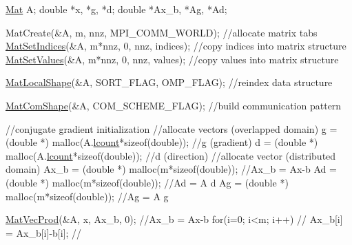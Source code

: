 \begin{DoxyCode}
    \hyperlink{structMat}{Mat} A;
    \textcolor{keywordtype}{double} *x, *g, *d;
    \textcolor{keywordtype}{double} *Ax\_b, *Ag, *Ad; 
   
    MatCreate(&A, m, nnz, MPI\_COMM\_WORLD);      \textcolor{comment}{//allocate matrix tabs}
    \hyperlink{group__matmap__group11_gaaf26c7678367e6757392c03abd22a105}{MatSetIndices}(&A, m*nnz, 0, nnz, indices);  \textcolor{comment}{//copy indices
       into matrix structure}
    \hyperlink{group__matmap__group11_gad3d5adb742e7a82454fcd6eede21da91}{MatSetValues}(&A, m*nnz, 0, nnz, values);    \textcolor{comment}{//copy values into
       matrix structure}
   
    \hyperlink{group__matmap__group11_gae31f7ccb10cda5c97e49f640feed1ad4}{MatLocalShape}(&A, SORT\_FLAG, OMP\_FLAG);     \textcolor{comment}{//reindex data
       structure}
   
    \hyperlink{group__matmap__group11_ga61b3b348d7c039aadfc3196e6b83535a}{MatComShape}(&A, COM\_SCHEME\_FLAG);           \textcolor{comment}{//build
       communication pattern }
   
    \textcolor{comment}{//conjugate gradient initialization}
    \textcolor{comment}{//allocate vectors (overlapped domain) }
    g  = (\textcolor{keywordtype}{double} *) malloc(A.\hyperlink{structMat_a983857e6f4ddb2c19a5119bcf1b6af63}{lcount}*\textcolor{keyword}{sizeof}(\textcolor{keywordtype}{double}));      \textcolor{comment}{//g (gradient)}
    d  = (\textcolor{keywordtype}{double} *) malloc(A.\hyperlink{structMat_a983857e6f4ddb2c19a5119bcf1b6af63}{lcount}*\textcolor{keyword}{sizeof}(\textcolor{keywordtype}{double}));      \textcolor{comment}{//d (direction)
        }
    \textcolor{comment}{//allocate vector (distributed domain) }
    Ax\_b = (\textcolor{keywordtype}{double} *) malloc(m*\textcolor{keyword}{sizeof}(\textcolor{keywordtype}{double}));           \textcolor{comment}{//Ax\_b = Ax-b}
    Ad = (\textcolor{keywordtype}{double} *) malloc(m*\textcolor{keyword}{sizeof}(\textcolor{keywordtype}{double}));             \textcolor{comment}{//Ad = A d}
    Ag = (\textcolor{keywordtype}{double} *) malloc(m*\textcolor{keyword}{sizeof}(\textcolor{keywordtype}{double}));             \textcolor{comment}{//Ag = A g}
   
    \hyperlink{group__matmap__group12a_gaf757d9249d31d2839b3376ac2e3f5574}{MatVecProd}(&A, x, Ax\_b, 0);           \textcolor{comment}{//Ax\_b = Ax-b}
    \textcolor{keywordflow}{for}(i=0; i<m; i++)                    \textcolor{comment}{// }
      Ax\_b[i] = Ax\_b[i]-b[i];             \textcolor{comment}{//}
   

\end{DoxyCode}

